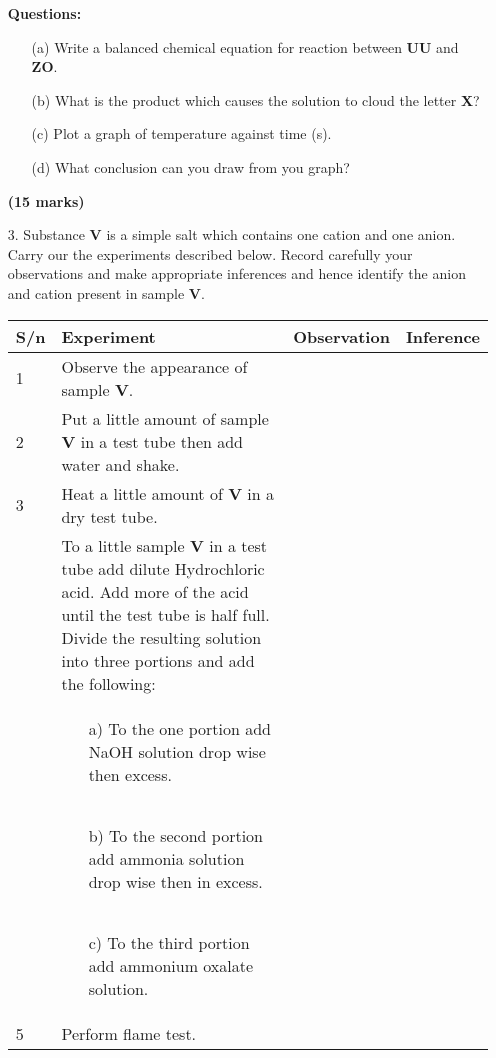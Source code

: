 \begin{enumerate}
\textbf{Questions:}\\
\begin{enumerate}
\item[(a)] Write a balanced chemical equation for reaction between \textbf{UU} and \textbf{ZO}.
\item[(b)] What is the product which causes the solution to cloud the letter \textbf{X}?
\item[(c)] Plot a graph of temperature against time (s).
\item[(d)] What conclusion can you draw from you graph?\\
\end{enumerate}

\raggedleft \textbf{(15 marks)}

\raggedright


\item[3.] Substance \textbf{V} is a simple salt which contains one cation and one anion. Carry our the experiments described below. Record carefully your observations and make appropriate inferences and hence identify the anion and cation present in sample \textbf{V}.\\

\begin{center}
\begin{tabular}{|l|p{8cm}|l|l|}
\hline
\textbf{S/n}&\textbf{Experiment}&\textbf{Observation}&\textbf{Inference}\\ \hline
1&Observe the appearance of sample \textbf{V}.&&\\ \hline
2&Put a little amount of sample \textbf{V} in a test tube then add water and shake.&&\\ \hline
3&Heat a little amount of \textbf{V} in a dry test tube.&&\\ \hline
{\multirow{4}{*}{4}}&To a little sample \textbf{V} in a test tube add dilute Hydrochloric acid. Add more of the acid until the test tube is half full. Divide the resulting solution into three portions and add the following:&&\\ \cline{2-4}
&\begin{enumerate}
\item[a)] To the one portion add NaOH solution drop wise then excess.
\end{enumerate}&&\\ \cline{2-4}
&\begin{enumerate}
\item[b)] To the second portion add ammonia solution drop wise then in excess.
\end{enumerate}&&\\ \cline{2-4}
&\begin{enumerate}
\item[c)] To the third portion add ammonium oxalate solution.
\end{enumerate}&&\\ \hline
5&Perform flame test.&&\\ \hline
\end{tabular}\\


\end{center}
\end{enumerate}
